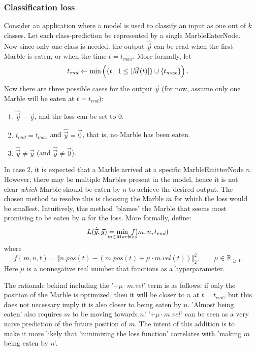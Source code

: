\subsubsection{Classification loss}
Consider an application where a \nenwin model is used to classify an input as one out of $k$ classes. Let each class-prediction be represented by a single MarbleEaterNode. Now since only one class is needed, the output $\hat{\vec{y}}$ can be read when the first Marble is eaten, or when the time $t = t_{max}$. More formally, let 
\begin{equation}
    t_{end} \leftarrow \min \left(\{t \; | \; 1 \leq \lvert \vec{M}(t) \rvert\}\cup \{t_{max}\}\right).
\end{equation}
Now there are three possible cases for the output $\hat{\vec{y}}$ 
(for now, assume only one Marble will be eaten at $t = t_{end}$):
\begin{enumerate}
    \item $\hat{\vec{y}} = \vec{y}$, and the loss can be set to 0.
    \item $t_{end} = t_{max}$ and $\hat{\vec{y}} = \vec{0}$, that is, no Marble has been eaten.
    \item $\hat{\vec{y}} \neq \vec{y}$ (and $\hat{\vec{y}} \neq \vec{0}$).
\end{enumerate}

In case 2, it is expected that a Marble arrived at a specific MarbleEmitterNode $n$. However, there may be multiple Marbles present in the model, hence it is not clear \textit{which} Marble should be eaten by $n$ to achieve the desired output. 
The chosen method to resolve this is choosing the Marble $m$ for which the loss would be smallest.
Intuitively, this method 'blames' the Marble that seems most promising to be eaten by $n$ for the loss.
More formally, define:
\begin{equation}
    L(\hat{\vec{y}}, \vec{y}) = \smashoperator{\min_{m \in Marbles}} \; f(m, n, t_{end}) \label{eq:classification_loss_net}
\end{equation}
where
\begin{equation}
    f(m, n, t) = \big\Vert{n.pos(t) - (m.pos(t) + \mu \cdot m.vel(t))}\big\Vert_2^2, \qquad \mu \in \mathbb{R}_{\geq 0}. \label{eq:classification_loss_one_marble}
\end{equation}
Here $\mu$ is a nonnegative real number that functions as a hyperparameter. 

The rationale behind including the '$+ \mu \cdot m.vel$' term is as follows: 
if only the position of the Marble is optimized, 
then it will be closer to $n$ at $t = t_{end}$, 
but this does not necessary imply it is also closer to being eaten by $n$. 
'Almost being eaten' also requires $m$ to be moving towards $n$!
'$+ \mu \cdot m.vel$' can be seen as a very naive prediction of the future position of $m$. 
The intent of this addition is to make it more likely that 'minimizing the loss function' correlates with 'making $m$ being eaten by $n$'.

